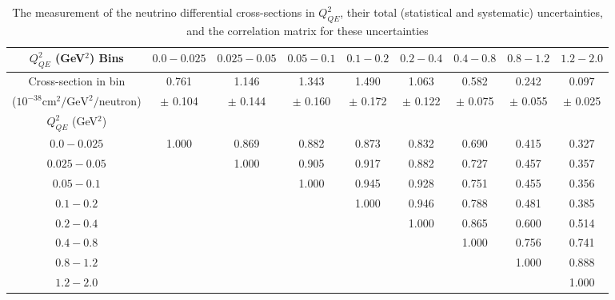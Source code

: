 \newcommand{\qsq}{\ensuremath{Q^2_{QE}}\xspace}
\renewcommand{\textfraction}{0.05}
\renewcommand{\topfraction}{0.95}
\renewcommand{\bottomfraction}{0.95}
\renewcommand{\floatpagefraction}{0.95}
\renewcommand{\dblfloatpagefraction}{0.95}
\renewcommand{\dbltopfraction}{0.95}
\setcounter{totalnumber}{5}
\setcounter{bottomnumber}{3}
\setcounter{topnumber}{3}
\setcounter{dbltopnumber}{3}

\begingroup
\squeezetable
\begin{table}[!h]
{\normalsize {}\hfill\vspace*{4ex}}
\tabcolsep=0.11cm
\begin{tabular}{c|cccccccc}
\hline
$\qsq$ (GeV$^2$) Bins & $0.0 - 0.025$ & $0.025 - 0.05$ & $0.05 - 0.1$ & $0.1 - 0.2$ & $0.2 - 0.4$ & $0.4 - 0.8$ & $0.8 - 1.2$ & $1.2 - 2.0$ \\ 
\hline
Cross-section in bin 
 & 0.761 & 1.146 & 1.343 & 1.490 & 1.063 & 0.582 & 0.242 & 0.097 \\ 
($10^{-38}\mathrm{cm}^2/\mathrm{GeV}^2/$neutron)  & $\pm$ 0.104 & $\pm$ 0.144 & $\pm$ 0.160 & $\pm$ 0.172 & $\pm$ 0.122 & $\pm$ 0.075 & $\pm$ 0.055 & $\pm$ 0.025\\
\hline
$Q^2_{QE}$ (GeV$^2$) & & & & & & & & \\
$0.0 - 0.025$  & 1.000 & 0.869 & 0.882 & 0.873 & 0.832 & 0.690 & 0.415 & 0.327 \\ 
$0.025 - 0.05$  &  & 1.000 & 0.905 & 0.917 & 0.882 & 0.727 & 0.457 & 0.357 \\ 
$0.05 - 0.1$  &  &  & 1.000 & 0.945 & 0.928 & 0.751 & 0.455 & 0.356 \\ 
$0.1 - 0.2$  &  &  &  & 1.000 & 0.946 & 0.788 & 0.481 & 0.385 \\ 
$0.2 - 0.4$  &  &  &  &  & 1.000 & 0.865 & 0.600 & 0.514 \\ 
$0.4 - 0.8$  &  &  &  &  &  & 1.000 & 0.756 & 0.741 \\ 
$0.8 - 1.2$  &  &  &  &  &  &  & 1.000 & 0.888 \\ 
$1.2 - 2.0$  &  &  &  &  &  &  &  & 1.000 \\ 
\hline
\end{tabular}
\caption{The measurement of the neutrino differential cross-sections in $Q^2_{QE}$,
their total (statistical and systematic) uncertainties, and the correlation matrix for these uncertainties}
\end{table}
\endgroup

